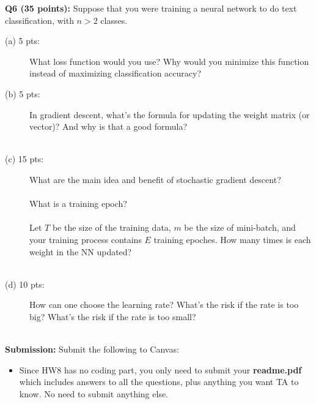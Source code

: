 \documentclass[11pt]{article}
\begin{document}
\vspace{0.4in}
\noindent
{\bf Q6 (35 points):} Suppose that you were training a neural network to do text classification, with $n > 2$ classes.

\begin{description}
\item [(a) 5 pts:] What loss function would you use? Why would you minimize this function instead of maximizing classification accuracy? \\

\item [(b) 5 pts:] In gradient descent, what's the formula for updating
   the weight matrix (or vector)? And why is that a good formula? \\ \\


\item [(c) 15 pts:] What are the main idea and benefit
  of stochastic gradient descent? \\ \\

  What is a training epoch? \\ \\

  Let $T$ be the size of the training data, $m$ be the size of mini-batch,
  and your training process contains $E$ training epoches.
  How many times is each weight in the NN updated? \\ \\ 


\item [(d) 10 pts:] How can one choose the learning rate? What's the risk
  if the rate is too big? What's the risk if the rate is too
  small? \\ \\ 

\end{description}



           

           





\vspace{0.5 in}
\noindent
{\bf Submission:}  Submit the following to Canvas:

\begin{itemize}
\item Since HW8 has no coding part, you only need to submit your {\bf readme.pdf}
  which includes answers to all the questions, plus anything you want
  TA to know. No need to submit anything else. 
  
\end{itemize}
\end{document}
